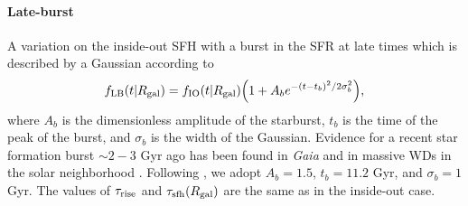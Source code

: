 \documentclass[twocolumn,twocolappendix]{aastex631}
\begin{document}
\paragraph{Late-burst} A variation on the inside-out SFH with a burst in the SFR at late times which is described by a Gaussian according to
\begin{equation}
    f_{\rm LB}(t|R_{\rm gal}) = f_{\rm IO}(t|R_{\rm gal}) \Big(1 + A_b e^{-(t-t_b)^2/2\sigma_b^2} \Big),
    \label{eq:lateburst-sfh}
\end{equation}
where $A_b$ is the dimensionless amplitude of the starburst, $t_b$ is the time of the peak of the burst, and $\sigma_b$ is the width of the Gaussian. 
Evidence for a recent star formation burst $\sim 2-3$ Gyr ago has been found in {\it Gaia} \citep{Mor2019-Starburst} and in massive WDs in the solar neighborhood \citep{Isern2019-Starburst}.
Following , we adopt $A_b=1.5$, $t_b=11.2$ Gyr, and $\sigma_b=1$ Gyr. The values of $\tau_{\rm rise}$ and $\tau_{\rm sfh}(R_{\rm gal})$ are the same as in the inside-out case.
\end{document}
